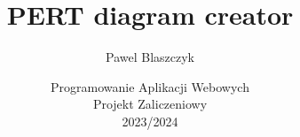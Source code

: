 \documentclass[]{article}
\title{PERT diagram creator}
\author{Pawel Blaszczyk}
\date{Programowanie Aplikacji Webowych\\[0.5em]
	Projekt Zaliczeniowy\\[1em]
	2023/2024}
\begin{document}
\maketitle

\begin{abstract}

\end{abstract}

\tableofcontents

\newpage





\end{document}
